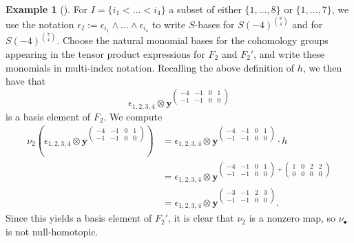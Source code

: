\documentclass[12pt]{amsart}
\theoremstyle{definition}
\newtheorem{eg}[equation]{Example}
\newenvironment{example}[1][]{\begin{eg}[#1] \pushQED{\qed}}{\popQED \end{eg}}
\begin{document}
\begin{example}
For $I=\{i_1<\dots <i_4\}$ a subset of either $\{1, \dots, 8\}$ or $\{1,
\dots, 7\}$, we use the notation $\epsilon_I:=\epsilon_{i_1}\wedge \dots
\wedge \epsilon_{i_4}$ to write $S$-bases for 
$S(-4)^{\binom{8}{4}}$ and for $S(-4)^{\binom{7}{4}}$.
Choose the natural monomial bases for the
cohomology groups appearing in the tensor product expressions for $F_2$ and $F_2'$, and write these monomials in multi-index notation.
Recalling the above definition of $h$, we then have that 
\[
\epsilon_{1,2,3,4}\otimes
\mathbf{y}^{\left(\begin{smallmatrix}-4&-1&0&1\\-1&-1&0&0
\end{smallmatrix}\right)}
\]
is a basis element of $F_2$.  We compute
\begin{align*}
\nu_2
\left(\epsilon_{1,2,3,4}\otimes
\mathbf{y}^{\left(\begin{smallmatrix}-4&-1&0&1\\-1&-1&0&0
\end{smallmatrix}\right)}\right)
& = \epsilon_{1,2,3,4}\otimes
\mathbf{y}^{\left(\begin{smallmatrix}-4&-1&0&1\\-1&-1&0&0
\end{smallmatrix}\right)}\cdot h\\
& = \epsilon_{1,2,3,4}\otimes
\mathbf{y}^{\left(\begin{smallmatrix}-4&-1&0&1\\-1&-1&0&0
\end{smallmatrix}\right)+\left(\begin{smallmatrix}1&0&2&2\\0&0&0&0
\end{smallmatrix}\right)}\\
& = \epsilon_{1,2,3,4}\otimes
\mathbf{y}^{\left(\begin{smallmatrix}-3&-1&2&3\\-1&-1&0&0
\end{smallmatrix}\right)}.
\end{align*}
Since this yields a basis element of $F_2'$, it is clear that $\nu_2$ is a nonzero map, 
so $\nu_\bullet$ is not null-homotopic.
\end{example}
\end{document}
